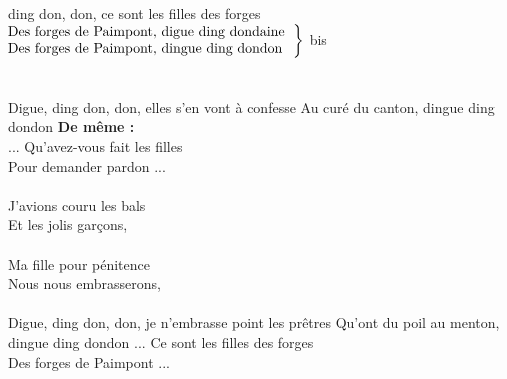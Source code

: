 
ding don, don, ce sont les filles des forges \bissimple\\
$\left.\begin{tabular}{l}
\hspace{-0.4cm}
Des forges de Paimpont, digue ding dondaine
\\
\hspace{-0.4cm}
Des forges de Paimpont, dingue ding dondon 
\end{tabular}\right\rbrace$ bis
\\\\\\Digue, ding don, don, elles s'en vont à confesse \bissimple
{}
{Au curé du canton, dingue ding dondon}
\textbf{De même :}
\\... Qu'avez-vous fait les filles
\\Pour demander pardon ...
\\\\J'avions couru les bals
\\Et les jolis garçons, 
\\\\Ma fille pour pénitence
\\Nous nous embrasserons,
\\\\Digue, ding don, don, je n'embrasse point les prêtres \bissimple
{}
{Qu'ont du poil au menton, dingue ding dondon}
... Ce sont les filles des forges
\\Des forges de Paimpont ...

\breakpage